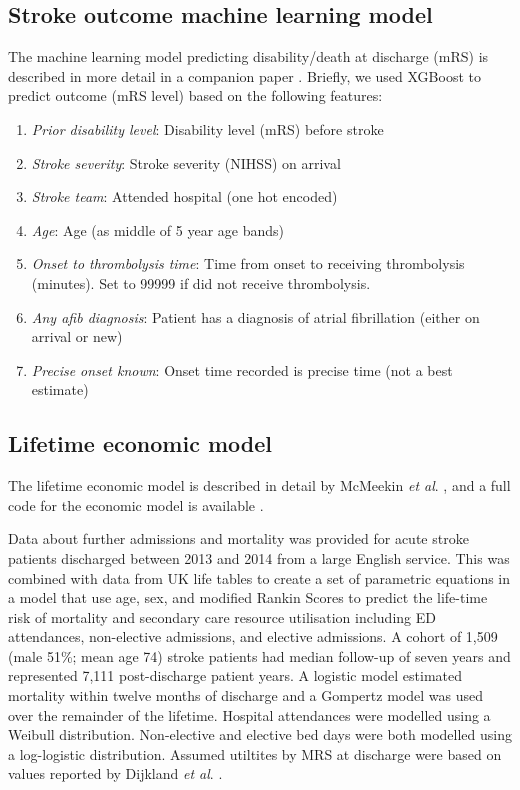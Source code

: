 \subsection{Stroke outcome machine learning model}

The machine learning model predicting disability/death at discharge (mRS) is described in more detail in a companion paper \cite{pearn_are_2024}. Briefly, we used XGBoost \cite{chen_xgboost_2016} to predict outcome (mRS level) based on the following features:

\begin{enumerate}
    \item \textit{Prior disability level}: Disability level (mRS) before stroke
    \item \textit{Stroke severity}: Stroke severity (NIHSS) on arrival
    \item \textit{Stroke team}: Attended hospital (one hot encoded)
    \item \textit{Age}: Age (as middle of 5 year age bands)
    \item \textit{Onset to thrombolysis time}: Time from onset to receiving thrombolysis (minutes). Set to 99999 if did not receive thrombolysis.
    \item \textit{Any afib diagnosis}: Patient has a diagnosis of atrial fibrillation (either on arrival or new)
    \item \textit{Precise onset known}: Onset time recorded is precise time (not a best estimate)
\end{enumerate}

\subsection{Lifetime economic model}

The lifetime economic model is described in detail by McMeekin \textit{et al}. \cite{mcmeekin_lifetime_2024}, and a full code for the economic model is available \cite{laws_stroke-optimiststreamlit_lifetime_stroke_2024}.

Data about further admissions and mortality was provided for acute stroke patients discharged between 2013 and 2014 from a large English service.  This was combined with data from UK life tables to create a set of parametric equations in a model that use age, sex, and modified Rankin Scores to predict the life-time risk of mortality and secondary care resource utilisation including ED attendances, non-elective admissions, and elective admissions. A cohort of 1,509 (male 51\%; mean age 74) stroke patients had median follow-up of seven years and represented 7,111 post-discharge patient years.  A logistic model estimated mortality within twelve months of discharge and a Gompertz model was used over the remainder of the lifetime. Hospital attendances were modelled using a Weibull distribution. Non-elective and elective bed days were both modelled using a log-logistic distribution. Assumed utiltites by MRS at discharge were based on values reported by Dijkland \textit{et al}. \cite{dijkland_utility-weighted_2018}.

